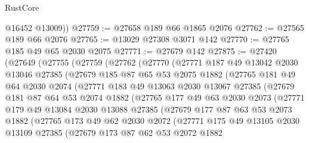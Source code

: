 \begin{lexlean}{RustCore}
\begin{coremodule}
        @16452
        @13009))
@27759 := @27658 @189 @66 @1865 @2076
@27762 := @27565 @189 @66 @2076
@27765 := @13029 @27308 @3071 @142
@27770 := @27765 @185 @49 @65 @2030 @2075
@27771 := @27679 @142
@27875 := @27420
    (@27649
      (@27755
        (@27759
          (@27762
            (@27770
              (@27771
                @187
                @49
                @13042
                @2030
                @13046
                @27385
                (@27679
                  @185
                  @87
                  @65
                  @53
                  @2075
                  @1882
                  (@27765
                    @181
                    @49
                    @64
                    @2030
                    @2074
                    (@27771
                      @183
                      @49
                      @13063
                      @2030
                      @13067
                      @27385
                      (@27679
                        @181
                        @87
                        @64
                        @53
                        @2074
                        @1882
                        (@27765
                          @177
                          @49
                          @63
                          @2030
                          @2073
                          (@27771
                            @179
                            @49
                            @13084
                            @2030
                            @13088
                            @27385
                            (@27679
                              @177
                              @87
                              @63
                              @53
                              @2073
                              @1882
                              (@27765
                                @173
                                @49
                                @62
                                @2030
                                @2072
                                (@27771
                                  @175
                                  @49
                                  @13105
                                  @2030
                                  @13109
                                  @27385
                                  (@27679
                                    @173
                                    @87
                                    @62
                                    @53
                                    @2072
                                    @1882

\end{coremodule}
\end{lexlean}

